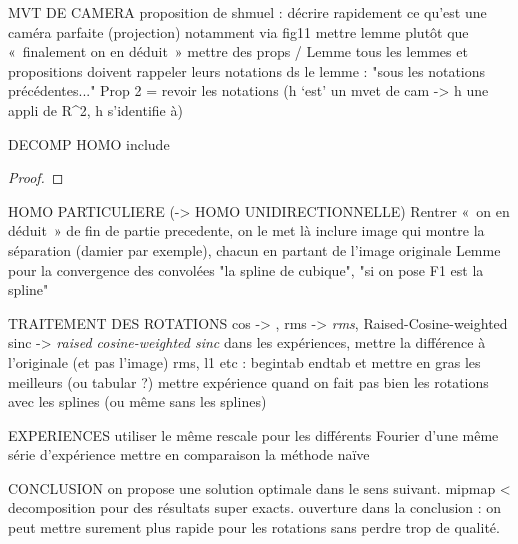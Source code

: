 MVT DE CAMERA
	proposition de shmuel : décrire rapidement ce qu'est une caméra parfaite (projection) notamment via fig11
	mettre lemme plutôt que « finalement on en déduit »
	mettre des props / Lemme
		tous les lemmes et propositions doivent rappeler leurs notations
		ds le lemme : "sous les notations précédentes..."
	Prop 2 = revoir les notations (h ‘est’ un mvet de cam -> h une appli de R^2, h s'identifie à)

DECOMP HOMO
	include \begin{proof} \end{proof}

HOMO PARTICULIERE (-> HOMO UNIDIRECTIONNELLE)
	Rentrer « on en déduit » de fin de partie precedente, on le met là
	inclure image qui montre la séparation (damier par exemple), chacun en partant de l'image originale
	Lemme pour la convergence des convolées
	"la spline de cubique", "si on pose F1 est la spline"

TRAITEMENT DES ROTATIONS
	cos -> \cos, rms -> \emph{rms}, Raised-Cosine-weighted sinc -> \emph{raised cosine-weighted sinc}
	dans les expériences, mettre la différence à l'originale (et pas l'image)
	rms, l1 etc : begin{tab} end{tab} et mettre en gras les meilleurs (ou tabular ?)
	mettre expérience quand on fait pas bien les rotations avec les splines (ou même sans les splines)

EXPERIENCES
	utiliser le même rescale pour les différents Fourier d'une même série d'expérience
	mettre en comparaison la méthode naïve

CONCLUSION
	on propose une solution optimale dans le sens suivant. mipmap < decomposition pour des résultats super exacts.
	ouverture dans la conclusion : on peut mettre surement plus rapide pour les rotations sans perdre trop de qualité.
